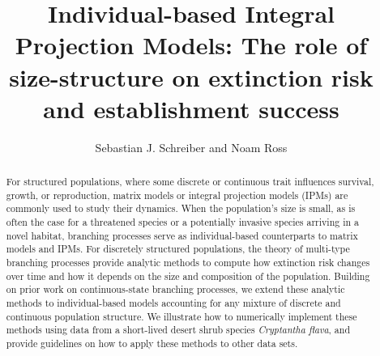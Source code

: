 \documentclass[12pt]{amsart}\usepackage[]{graphicx}\usepackage[]{color}
\begin{document}



\title[Extinction in Individual-based IPMs]{Individual-based Integral Projection Models: The role of size-structure on
  extinction risk and establishment success}
\author{Sebastian J. Schreiber and Noam Ross}
\address{Department of Evolution and Ecology, One Shields Avenue, University of California, Davis, California 95616}
\address{Current Address: Department of Environmental Science and Policy, University of California, Davis, California 95616}
\address{Address effective October 1, 2015: EcoHealth Alliance,
460 West 34th Street – 17th floor, New York, NY 10001  }
\maketitle{}

\begin{abstract}
For structured populations, where some discrete or continuous trait influences survival, growth, or reproduction, matrix models or integral projection models (IPMs) are commonly used to study their dynamics. When the population's size is small, as is often the case for a threatened species or a potentially invasive species arriving in a novel habitat,  branching processes serve as individual-based counterparts to matrix models and IPMs. For discretely structured populations, the theory of multi-type branching processes provide analytic methods to compute how extinction risk changes over time and how it depends on the size and composition of the population. Building on prior work on continuous-state branching processes, we extend these analytic methods to individual-based models accounting for any mixture of discrete and continuous population structure. We illustrate how to numerically implement these methods using data from a short-lived desert shrub species \emph{Cryptantha flava}, and provide guidelines on how to apply these methods to other data sets.
\end{abstract}
\end{document}
